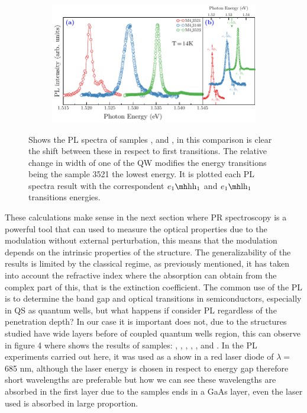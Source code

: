 \begin{figure}[H]
	\centering
	\begin{subfigure}{\textwidth}
		\includegraphics[width=\textwidth]{../figures/chapter-3/pl-plots/build-ruco/pl-2}
		\label{subfig:chapter-3-PL-experiments-M4_3140-M4_3521-M4_3523-a)}
		\label{subfig:chapter-3-PL-experiments-M4_3140-M4_3521-M4_3523-b)}
	\end{subfigure}
	\caption{ Shows the PL spectra of samples ,  and , in this comparison is clear the shift  between these in respect to first transitions. The relative change in width of one of the QW modifies the  energy transitions being the sample 3521 the lowest energy.  It is plotted  each PL spectra result with the correspondent $\thh{1}{1}$ and $\tlh{1}{1}$ transitions energies. }
	\label{fig:chapter-3-PL-experiments-M4_3140-M4_3521-M4_3523}
\end{figure}

These calculations make sense in the next section where PR spectroscopy is a powerful tool that can used to measure the optical properties due to the modulation without external perturbation, this means that the modulation depends on the intrinsic properties of the structure. The generalizability of the results is limited by the classical regime, as previously mentioned, it has taken into account the refractive index where the absorption can obtain from the complex part of this,  that is the extinction coefficient. The common use of the PL is to determine the band gap and optical transitions in semiconductors, especially in QS as quantum wells, but what happens if consider PL regardless of the penetration depth? 
In our case it is important does not, due to the structures studied have wide layers before of coupled quantum wells region, this can observe in figure 4 where shows the results of samples: , , , , , and .  In the PL experiments carried out here,  it was used as a show in  a red laser diode 
of  $\lambda=$685 nm, although the laser energy is chosen in respect to energy gap therefore short wavelengths are preferable but how we can see these wavelengths are absorbed in the first layer due to the samples ends in a GaAs layer, even the laser used is absorbed in large proportion. 

